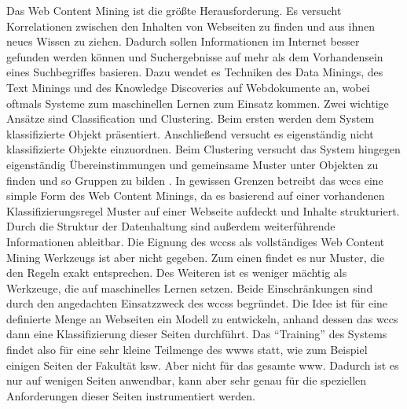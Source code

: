         Das Web Content Mining ist die größte Herausforderung.
        Es versucht Korrelationen zwischen den Inhalten von Webseiten zu finden
        und aus ihnen neues Wissen zu ziehen.
        Dadurch sollen Informationen im Internet besser gefunden werden können
        und Suchergebnisse auf mehr als dem Vorhandensein eines Suchbegriffes basieren.
        Dazu wendet es Techniken des Data Minings,
        des Text Minings und des Knowledge Discoveries auf Webdokumente an,
        wobei oftmals Systeme zum maschinellen Lernen zum Einsatz kommen.
        Zwei wichtige Ansätze sind Classification und Clustering.
        Beim ersten werden dem System klassifizierte Objekt präsentiert.
        Anschließend versucht es eigenständig nicht klassifizierte Objekte einzuordnen.
        Beim Clustering versucht das System hingegen eigenständig
        Übereinstimmungen und gemeinsame Muster unter Objekten zu finden
        und so Gruppen zu bilden
        \cite[Part II]{markov:webMining}.
        In gewissen Grenzen betreibt das \gls{wccs} eine simple Form des Web Content Minings,
        da es basierend auf einer vorhandenen Klassifizierungsregel
        Muster auf einer Webseite aufdeckt und Inhalte strukturiert.
        Durch die Struktur der Datenhaltung sind außerdem weiterführende Informationen ableitbar.
        Die Eignung des \glspl{wccs} als vollständiges Web Content Mining Werkzeugs ist
        aber nicht gegeben.
        Zum einen findet es nur Muster, die den Regeln exakt entsprechen.
        Des Weiteren ist es weniger mächtig als Werkzeuge,
        die auf maschinelles Lernen setzen.
        Beide Einschränkungen sind durch den angedachten Einsatzzweck des \glspl{wccs} begründet.
        Die Idee ist für eine definierte Menge an Webseiten ein Modell zu entwickeln,
        anhand dessen das \gls{wccs} dann eine Klassifizierung dieser Seiten durchführt.
        Das "`Training"' des Systems findet also für eine sehr kleine Teilmenge des \glspl{www} statt,
        wie zum Beispiel einigen Seiten der Fakultät \gls{ksw}.
        Aber nicht für das gesamte \gls{www}.
        Dadurch ist es nur auf wenigen Seiten anwendbar,
        kann aber sehr genau für die speziellen Anforderungen dieser Seiten instrumentiert werden.      

